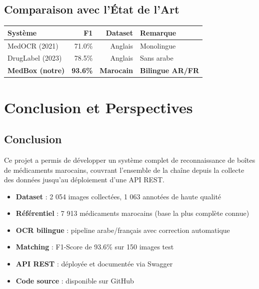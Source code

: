 \documentclass[12pt,a4paper]{report}
\begin{document}
\section{Comparaison avec l'\'Etat de l'Art}

\begin{center}
\begin{tabular}{lrrl}
\toprule
\textbf{Syst\`eme} & \textbf{F1} & \textbf{Dataset} & \textbf{Remarque} \\
\midrule
MedOCR (2021) & 71.0\% & Anglais & Monolingue \\
DrugLabel (2023) & 78.5\% & Anglais & Sans arabe \\
\textbf{MedBox (notre)} & \textbf{93.6\%} & \textbf{Marocain} & \textbf{Bilingue AR/FR} \\
\bottomrule
\end{tabular}
\end{center}

\chapter*{Conclusion et Perspectives}

\section*{Conclusion}

Ce projet a permis de d\'evelopper un syst\`eme complet de reconnaissance de bo\^ites de m\'edicaments marocains, couvrant l'ensemble de la cha\^ine depuis la collecte des donn\'ees jusqu'au d\'eploiement d'une API REST.

\begin{successbox}
\begin{itemize}
  \item[$\checkmark$] \textbf{Dataset} : 2 054 images collect\'ees, 1 063 annot\'ees de haute qualit\'e
  \item[$\checkmark$] \textbf{R\'ef\'erentiel} : 7 913 m\'edicaments marocains (base la plus compl\`ete connue)
  \item[$\checkmark$] \textbf{OCR bilingue} : pipeline arabe/fran\c{c}ais avec correction automatique
  \item[$\checkmark$] \textbf{Matching} : F1-Score de 93.6\% sur 150 images test
  \item[$\checkmark$] \textbf{API REST} : d\'eploy\'ee et document\'ee via Swagger
  \item[$\checkmark$] \textbf{Code source} : disponible sur GitHub
\end{itemize}
\end{successbox}
\end{document}
